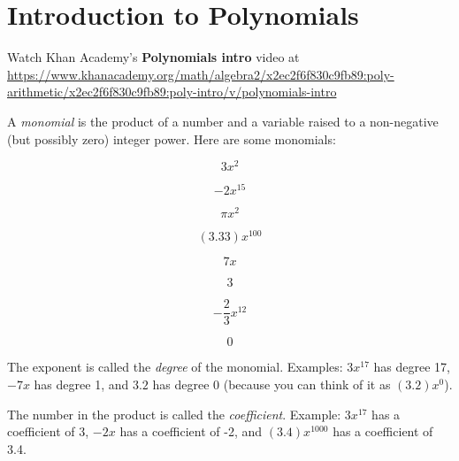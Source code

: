 \chapter{Introduction to Polynomials}

Watch Khan Academy's \textbf{Polynomials intro} video at \url{https://www.khanacademy.org/math/algebra2/x2ec2f6f830c9fb89:poly-arithmetic/x2ec2f6f830c9fb89:poly-intro/v/polynomials-intro}

A \emph{monomial} is the product of a number and a variable raised to a non-negative (but possibly zero) integer power. Here are some monomials:
\begin{multicols}{4}
  \begin{equation*}
    3 x^2
  \end{equation*}

  \begin{equation*}
    -2 x^{15}
  \end{equation*}

  \begin{equation*}
    \pi x^2
  \end{equation*}

  \begin{equation*}
    (3.33)x^{100}
  \end{equation*}

  \begin{equation*}
    7x
  \end{equation*}

  \begin{equation*}
    3
  \end{equation*}

  \begin{equation*}
    -\frac{2}{3}x^{12}
  \end{equation*}

  \begin{equation*}
    0
  \end{equation*}

  
\end{multicols}

The exponent is called the \emph{degree} of the monomial. Examples: $3x^{17}$
has degree 17, $-7x$ has degree 1, and $3.2$ has degree 0 (because you can think of it as $(3.2)x^0$).

The number in the product is called the \emph{coefficient}.  Example: $3x^{17}$ has a coefficient of 3, $-2x$ has a coefficient of -2, and $(3.4)x^{1000}$ has a coefficient of 3.4.

